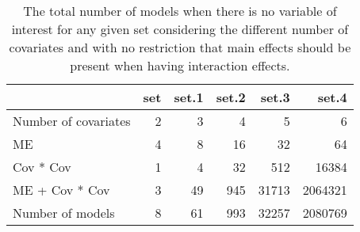 \begin{table}[!h]
\centering
\caption{The total number of models when there is no variable of interest for any given set considering the different number of covariates and with no restriction that main effects should be present when having interaction effects.} 
\begin{tabular}{lrrrrr}
  \hline
 & set & set.1 & set.2 & set.3 & set.4 \\ 
  \hline
Number of covariates & 2 & 3 & 4 & 5 & 6 \\ 
  ME & 4 & 8 & 16 & 32 & 64 \\ 
  Cov * Cov & 1 & 4 & 32 & 512 & 16384 \\ 
  ME + Cov * Cov & 3 & 49 & 945 & 31713 & 2064321 \\ 
  Number of models & 8 & 61 & 993 & 32257 & 2080769 \\ 
   \hline
\end{tabular}
\end{table}
